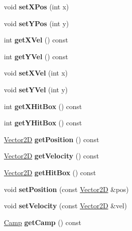 \begin{DoxyCompactItemize}
void {\bfseries set\+X\+Pos} (int x)
\item 
\mbox{\label{class_entity_a66278a362d97e2a30912c2a31962bfb9}} 
void {\bfseries set\+Y\+Pos} (int y)
\item 
\mbox{\label{class_entity_a31c55ae9457507b1c3ad5688b8f2eda2}} 
int {\bfseries get\+X\+Vel} () const
\item 
\mbox{\label{class_entity_abaf01d725e35883d60f1fec3f39a8ea0}} 
int {\bfseries get\+Y\+Vel} () const
\item 
\mbox{\label{class_entity_a7f20a2190046121150e5903ec769e9dc}} 
void {\bfseries set\+X\+Vel} (int x)
\item 
\mbox{\label{class_entity_a9d7c4a35217e6f83ac21da314aa3ec9a}} 
void {\bfseries set\+Y\+Vel} (int y)
\item 
\mbox{\label{class_entity_a5077b09978b28e502737475686ee893d}} 
int {\bfseries get\+X\+Hit\+Box} () const
\item 
\mbox{\label{class_entity_ad46d1d4faf814a6b501101bc1c914754}} 
int {\bfseries get\+Y\+Hit\+Box} () const
\item 
\mbox{\label{class_entity_a6086a606c751be107efdc29109346d32}} 
\hyperlink{structbasic__vector2_d}{Vector2D} {\bfseries get\+Position} () const
\item 
\mbox{\label{class_entity_a3107fab87440ee7e410c4a98505dfc50}} 
\hyperlink{structbasic__vector2_d}{Vector2D} {\bfseries get\+Velocity} () const
\item 
\mbox{\label{class_entity_a4d69956308b0a0396ddba314c0aa0972}} 
\hyperlink{structbasic__vector2_d}{Vector2D} {\bfseries get\+Hit\+Box} () const
\item 
\mbox{\label{class_entity_a372b9155542c8a228a4f1305f5f67341}} 
void {\bfseries set\+Position} (const \hyperlink{structbasic__vector2_d}{Vector2D} \&pos)
\item 
\mbox{\label{class_entity_af41c73b5b2a7e68a7f285b12d0dab9f1}} 
void {\bfseries set\+Velocity} (const \hyperlink{structbasic__vector2_d}{Vector2D} \&vel)
\item 
\mbox{\label{class_entity_a80b1c04df243bcdba1225a10e54995f1}} 
\hyperlink{_entity_8h_ad54c4fe39f1c51b786c24ae0b7763b44}{Camp} {\bfseries get\+Camp} () const
\end{DoxyCompactItemize}
